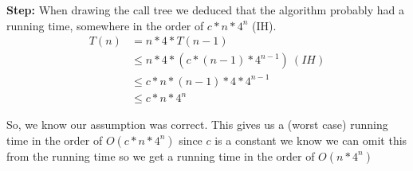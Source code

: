 \documentclass{article}
\begin{document}
\begin{itemize}
\begin{itemize}
\textbf{Step:} When drawing the call tree we deduced that the algorithm probably had a running time, somewhere in the order of $c * n * 4^n$ (IH).
\begin{align*}
T(n) &= n * 4 * T(n-1) \\
&\le n * 4 * (c*(n-1)*4^{n-1})\ (IH)\\
&\le c*n * (n-1) *4 *4^{n-1}\\
&\le c*n*4^n
\end{align*}

So, we know our assumption was correct. This gives us a (worst case) running time in the order of $O(c*n*4^n)$ since $c$ is a constant we know we can omit this from the running time so we get a running time in the order of $O(n*4^n)$


\end{itemize}
\end{itemize}
\end{document}
